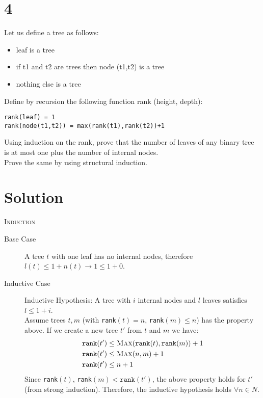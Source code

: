 \documentclass{article}
\begin{document}

\section*{4}
Let us define a tree as follows:

\begin{itemize}
\item leaf is a tree
\item if t1 and t2 are trees then node (t1,t2) is a tree
\item nothing else is a tree
\end{itemize}

\noindent Define by recursion the following function rank (height, depth):

\begin{verbatim}
rank(leaf) = 1
rank(node(t1,t2)) = max(rank(t1),rank(t2))+1
\end{verbatim}

\noindent Using induction on the rank, prove that the number of leaves of any binary tree is at most one plus the number of internal nodes.\\

\noindent Prove the same by using structural induction.

\section*{Solution}
\textsc{Induction}
\begin{description}
\item[Base Case] A tree $t$ with one leaf has no internal nodes, therefore $l(t) \leq 1 + n(t) \to 1 \leq 1 + 0$.
\item[Inductive Case] Inductive Hypothesis: A tree with $i$ internal nodes and $l$ leaves satisfies $l \leq 1 + i$.\\
Assume trees $t,m$ (with \texttt{rank}$(t) = n$, \texttt{rank}$(m) \leq n$) has the property above. If we create a new tree $t'$ from $t$ and $m$ we have: 
\begin{align*}
\texttt{rank}(t') &\leq \textsc{Max}(\texttt{rank}(t), \texttt{rank}(m)) + 1\\
\texttt{rank}(t') &\leq \textsc{Max}(n, m) + 1\\
\texttt{rank}(t') &\leq n + 1\\
\end{align*}
Since \texttt{rank}$(t)$, \texttt{rank}$(m) < \texttt{rank}(t')$, the above property holds for $t'$ (from strong induction). Therefore, the inductive hypothesis holds $\forall n \in N$.
\end{description}
\end{document}
